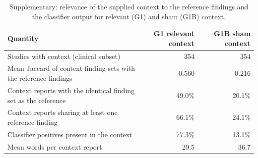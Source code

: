 \begin{table}[t]
\centering
\scriptsize
\begin{tabular}{lrr}
\hline
Quantity & G1 relevant context & G1B sham context \\
\hline
Studies with context (clinical subset) & 354 & 354 \\
Mean Jaccard of context finding sets with the reference findings & 0.560 & 0.216 \\
Context reports with the identical finding set as the reference & 49.0\% & 20.1\% \\
Context reports sharing at least one reference finding & 66.1\% & 24.1\% \\
Classifier positives present in the context & 77.3\% & 13.1\% \\
Mean words per context report & 29.5 & 36.7 \\
\hline
\end{tabular}
\caption{Supplementary: relevance of the supplied context to the reference findings and the classifier output for relevant (G1) and sham (G1B) context.}
\label{tab:table8_supplementary_context_manipulation_check}
\end{table}
